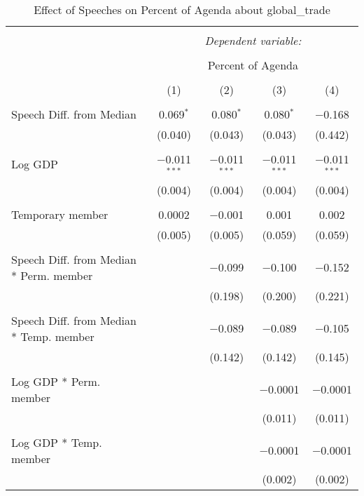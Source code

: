 
\begin{table}[!htbp] \centering 
  \caption{Effect of Speeches on Percent of Agenda about global_trade} 
  \label{} 
\begin{tabular}{@{\extracolsep{5pt}}lcccc} 
\\[-1.8ex]\hline 
\hline \\[-1.8ex] 
 & \multicolumn{4}{c}{\textit{Dependent variable:}} \\ 
\cline{2-5} 
\\[-1.8ex] & \multicolumn{4}{c}{Percent of Agenda} \\ 
\\[-1.8ex] & (1) & (2) & (3) & (4)\\ 
\hline \\[-1.8ex] 
 Speech Diff. from Median & 0.069$^{*}$ & 0.080$^{*}$ & 0.080$^{*}$ & $-$0.168 \\ 
  & (0.040) & (0.043) & (0.043) & (0.442) \\ 
  & & & & \\ 
 Log GDP & $-$0.011$^{***}$ & $-$0.011$^{***}$ & $-$0.011$^{***}$ & $-$0.011$^{***}$ \\ 
  & (0.004) & (0.004) & (0.004) & (0.004) \\ 
  & & & & \\ 
 Temporary member & 0.0002 & $-$0.001 & 0.001 & 0.002 \\ 
  & (0.005) & (0.005) & (0.059) & (0.059) \\ 
  & & & & \\ 
 Speech Diff. from Median * Perm. member &  & $-$0.099 & $-$0.100 & $-$0.152 \\ 
  &  & (0.198) & (0.200) & (0.221) \\ 
  & & & & \\ 
 Speech Diff. from Median * Temp. member &  & $-$0.089 & $-$0.089 & $-$0.105 \\ 
  &  & (0.142) & (0.142) & (0.145) \\ 
  & & & & \\ 
 Log GDP * Perm. member &  &  & $-$0.0001 & $-$0.0001 \\ 
  &  &  & (0.011) & (0.011) \\ 
  & & & & \\ 
 Log GDP * Temp. member &  &  & $-$0.0001 & $-$0.0001 \\ 
  &  &  & (0.002) & (0.002) \\ 

\end{tabular}
\end{table}
